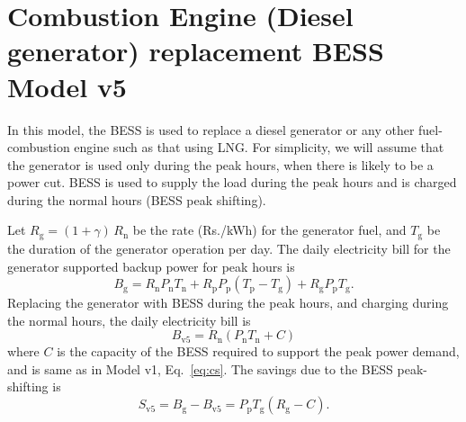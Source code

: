 \documentclass[a4paper]{article}
\begin{document}
\section{Combustion Engine (Diesel generator) replacement BESS Model v5}

In this model, the BESS is used to replace a diesel generator or any other
fuel-combustion engine such as that using LNG. For simplicity, we will
assume that the generator is used only during the peak hours, when there
is likely to be a power cut. BESS is used to supply the load during the
peak hours and is charged during the normal hours (BESS peak shifting).

Let $R_{\text{g}} = (1 + \gamma) \, R_\text{n}$ be the rate (Rs./kWh) for the generator fuel, and
$T_{\text{g}}$ be the duration of the generator operation per day. The daily
electricity bill for the generator
supported backup power for peak hours is
\begin{equation}
    B_{\text{g}} = 
    R_{\text{n}} P_{\text{n}} T_{\text{n}} +
    R_{\text{p}} P_{\text{p}} (T_{\text{p}} - T_\text{g})  + 
    R_{\text{g}} P_{\text{p}} T_{\text{g}} .
\end{equation}
Replacing the generator with BESS during the peak hours,
and charging during the normal hours, the daily electricity bill is
\begin{equation}
    B_{\text{v5}} = 
    R_\text{n} \left( P_{\text{n}} T_{\text{n}} +  
    C \right)
\end{equation}
where $C$ is the capacity of the BESS required to support the peak power demand, 
and is same as in Model v1, Eq.~\eqref{eq:cs}.
The savings due to the BESS peak-shifting is
\begin{equation}
    S_\text{v5} = B_{\text{g}} - B_{\text{v5}} 
    = P_{\text{p}} T_{\text{g}} \left(R_{\text{g}} - C \right).
\end{equation}
\end{document}
